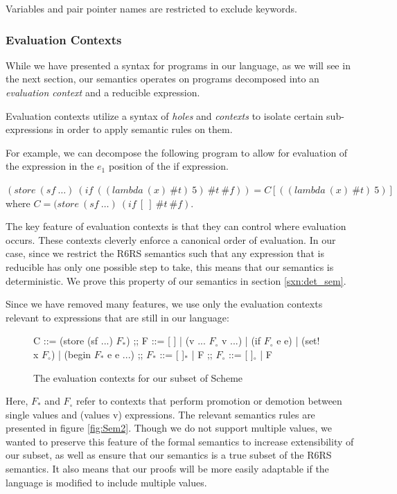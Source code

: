 Variables and pair pointer names are restricted to exclude keywords.

\subsubsection{Evaluation Contexts}
While we have presented a syntax for programs in our language, as we will see in the next section, our semantics operates on programs decomposed into an \textit{evaluation context} and a reducible expression.

Evaluation contexts utilize a syntax of \textit{holes} and \textit{contexts} to isolate certain sub-expressions in order to apply semantic rules on them.

For example, we can decompose the following program to allow for evaluation of the expression in the \textit{$e_1$} position of the if expression.

$(store\ (sf\ \dots)\ (if\ ((lambda\ (x)\ \#t)\ 5)\ \#t\ \#f)) = C[((lambda\ (x)\ \#t)\ 5)]$ where $C = (store\ (sf\ \dots)\ (if\ [\ ]\ \#t\ \#f)$.

The key feature of evaluation contexts is that they can control where evaluation occurs. These contexts cleverly enforce a canonical order of evaluation. In our case, since we restrict the R6RS semantics such that any expression that is reducible has only one possible step to take, this means that our semantics is deterministic. We prove this property of our semantics in section \ref{sxn:det_sem}.

Since we have removed many features, we use only the evaluation contexts relevant to expressions that are still in our language:

\begin{figure}[h]
    \centering
\begin{bnfgrammar}
    C ::= (store (sf ...) $F_{*}$)
    ;;
    F ::= [ ]
    |   (v ... $F_{\circ}$ v ...)
    |   (if $F_{\circ}$ e e)
    |   (set! x $F_{\circ}$)
    |   (begin $F_{*}$ e e ...)
    ;;
    $F_{*}$ ::= [ ]$_{*}$
    |   F
    ;;
    $F_{\circ}$ ::= [ ]$_{\circ}$
    |   F
\end{bnfgrammar}
    \caption{The evaluation contexts for our subset of Scheme}
    \label{fig:eval_ctx}
\end{figure}

Here, $F_{*}$ and $F_{\circ}$ refer to contexts that perform promotion or demotion between single values and (values v) expressions. The relevant semantics rules are presented in figure \ref{fig:Sem2}. Though we do not support multiple values, we wanted to preserve this feature of the formal semantics to increase extensibility of our subset, as well as ensure that our semantics is a true subset of the R6RS semantics. It also means that our proofs will be more easily adaptable if the language is modified to include multiple values.

